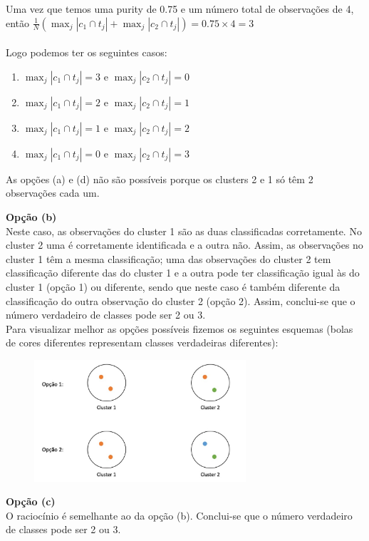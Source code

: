 \documentclass[a4paper,12pt]{article} %
\begin{document}
\begin{enumerate}
Uma vez que temos uma purity de 0.75 e um número total de observações de 4,
então $\frac{1}{N} \left( \max_j |c_1 \cap t_j| + \max_j |c_2 \cap t_j| \right) = 0.75 \times 4 = 3$ \\ \\

Logo podemos ter os seguintes casos:
\begin{enumerate}
    \item $\max_j |c_1 \cap t_j| = 3$ e $\max_j |c_2 \cap t_j| = 0$
    \item $\max_j |c_1 \cap t_j| = 2$ e $\max_j |c_2 \cap t_j| = 1$
    \item $\max_j |c_1 \cap t_j| = 1$ e $\max_j |c_2 \cap t_j| = 2$
    \item $\max_j |c_1 \cap t_j| = 0$ e $\max_j |c_2 \cap t_j| = 3$
\end{enumerate}

As opções (a) e (d) não são possíveis porque os clusters 2 e 1 só têm 2 observações cada um. 

\textbf{Opção (b)} \\ 
Neste caso, as observações do cluster 1 são as duas classificadas corretamente. 
No cluster 2 uma é corretamente identificada e a outra não. Assim, as observações 
no cluster 1 têm a mesma classificação; uma das observações do cluster 2 tem classificação
diferente das do cluster 1 e a outra pode ter classificação igual às do cluster 1 (opção 1)
ou diferente, sendo que neste caso é também diferente da classificação do outra observação
do cluster 2 (opção 2). Assim, conclui-se que o número verdadeiro de classes pode ser 2 ou 3. \\
Para visualizar melhor as opções possíveis fizemos os seguintes esquemas 
(bolas de cores diferentes representam classes verdadeiras diferentes):

\begin{figure}[H]
\centering
\includegraphics[width=0.7\textwidth]{ex4_clusters.jpg}
\end{figure}

\textbf{Opção (c)} \\
O raciocínio é semelhante ao da opção (b). Conclui-se que o número verdadeiro de classes pode ser 2 ou 3.

\end{enumerate}
\end{document}
